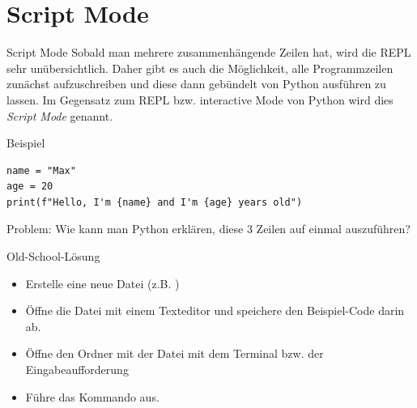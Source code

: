 \section{Script Mode}
\begin{frame}
\begin{block}{Script Mode}
	\vspace{2pt}
	Sobald man mehrere zusammenhängende Zeilen hat, wird die REPL sehr unübersichtlich. Daher gibt es auch die Möglichkeit, alle Programmzeilen zunächst aufzuschreiben und diese dann gebündelt von Python ausführen zu lassen. Im Gegensatz zum REPL bzw. interactive Mode von Python wird dies \emph{Script Mode} genannt.    
\end{block}
\end{frame}

\begin{fragile}[]
\begin{exampleblock}{Beispiel}
\begin{verbatim}
name = "Max"
age = 20
print(f"Hello, I'm {name} and I'm {age} years old") 
\end{verbatim}
\end{exampleblock}
\pause
\begin{alertblock}{Problem:}
\vspace{2pt}
Wie kann man Python erklären, diese 3 Zeilen auf einmal auszuführen? 
\end{alertblock}
\end{fragile}

\begin{frame}
\begin{block}{Old-School-Lösung}
\vspace{2pt}
\begin{itemize}
	\item Erstelle eine neue Datei (z.B. )
	\item Öffne die Datei mit einem Texteditor und speichere den Beispiel-Code darin ab.
	\item Öffne den Ordner mit der Datei  mit dem Terminal bzw. der Eingabeaufforderung
	\item Führe das Kommando  aus. 
\end{itemize}
\end{block}
\end{frame}

